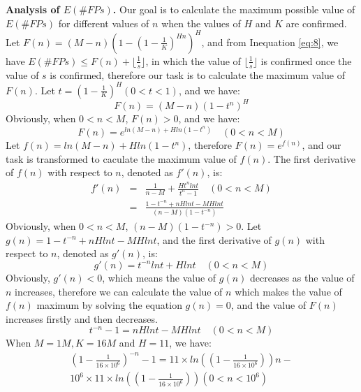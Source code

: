 \documentclass[conference]{IEEEtran}
\begin{document}
\textbf{Analysis of $E(\#FPs)$.}
Our goal is to calculate the maximum possible value of $E(\#FPs)$ for different values of $n$ when the values of $H$ and $K$ are confirmed. Let $F(n)=(M-n)(1-(1-\frac{1}{K})^{Hn})^H$, and from Inequation \ref{eq:8}, we have $E(\#FPs)\leq F(n)+\lfloor\frac{1}{s}\rfloor$, in which the value of $\lfloor\frac{1}{s}\rfloor$ is confirmed once the value of $s$ is confirmed, therefore our task is to calculate the maximum value of $F(n)$. Let $t=(1-\frac{1}{K})^{H}(0<t<1)$, and we have:
\begin{equation}\label{eq:16}
F(n)=(M-n)(1-t^n)^H
\end{equation}
Obviously, when $0<n<M$, $F(n)>0$, and we have:
\begin{equation}
F(n)=e^{ln(M-n)+Hln(1-t^n)} \quad (0<n<M)
\end{equation}
Let $f(n)=ln(M-n)+Hln(1-t^n)$, therefore $F(n)=e^{f(n)}$, and our task is transformed to caculate the maximum value of $f(n)$. The first derivative of $f(n)$ with respect to $n$, denoted as $f'(n)$, is:
\begin{eqnarray}
f'(n)&=&\frac{1}{n-M}+\frac{Ht^nlnt}{t^n-1} \quad (0<n<M)\\
&=&\frac{1-t^{-n}+nHlnt-MHlnt}{(n-M)(1-t^{-n})}
\end{eqnarray}
Obviously, when $0<n<M$, $(n-M)(1-t^{-n})>0$. Let $g(n)=1-t^{-n}+nHlnt-MHlnt$, and the first derivative of $g(n)$ with respect to $n$, denoted as $g'(n)$, is:
\begin{equation}
g'(n)=t^{-n}lnt+Hlnt\quad (0<n<M)
\end{equation}
Obviously, $g'(n)<0$, which means the value of $g(n)$ decreases as the value of $n$ increases, therefore we can calculate the value of $n$ which makes the value of $f(n)$ maximum by solving the equation $g(n)=0$, and the value of $F(n)$ increases firstly and then decreases.
\begin{equation}
t^{-n}-1=nHlnt-MHlnt\quad (0<n<M)
\end{equation}
When $M=1M,K=16M$ and $H=11$, we have:
\begin{eqnarray}\label{eq:matlab}
(1-\frac{1}{16\times 10^6})^{-n}-1=11\times ln((1-\frac{1}{16\times 10^6}))n-\nonumber\\
10^6\times 11\times ln((1-\frac{1}{16\times 10^6})) (0<n<10^6)
\end{eqnarray}
\end{document}
